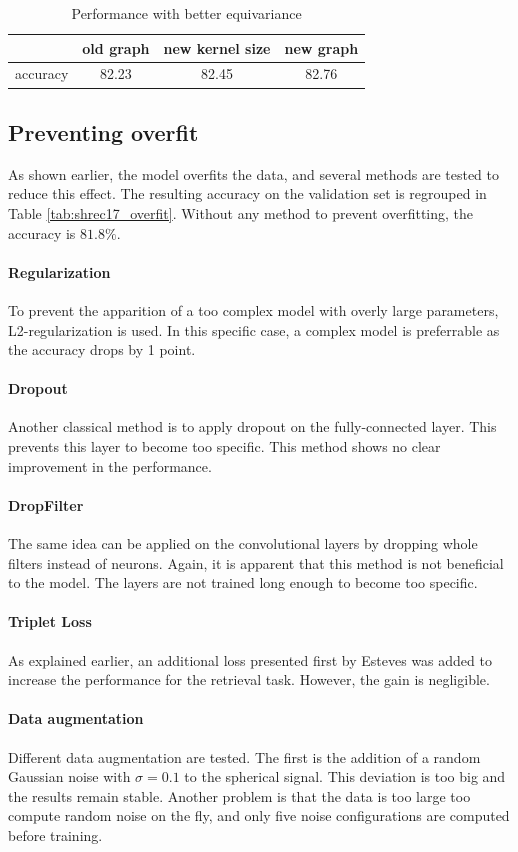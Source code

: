 \documentclass[11pt]{report}
\begin{document}
\begin{table}[]
    \centering
    \begin{tabular}{c|ccc}
          & old graph & new kernel size & new graph \\ \hline
accuracy  & 82.23 & 82.45 & 82.76
    \end{tabular}
    \caption{Performance with better equivariance}
    \label{tab:martino_shrec17}
\end{table}

\subsection{Preventing overfit}\label{sec:shrec17_overfit}
As shown earlier, the model overfits the data, and several methods are tested to reduce this effect. The resulting accuracy on the validation set is regrouped in Table \ref{tab:shrec17_overfit}. Without any method to prevent overfitting, the accuracy is $81.8\%$.
\paragraph*{Regularization}
To prevent the apparition of a too complex model with overly large parameters, L2-regularization is used. In this specific case, a complex model is preferrable as the accuracy drops by 1 point.
\paragraph*{Dropout}
Another classical method is to apply dropout on the fully-connected layer. This prevents this layer to become too specific. This method shows no clear improvement in the performance.
\paragraph*{DropFilter}
The same idea can be applied on the convolutional layers by dropping whole filters instead of neurons. Again, it is apparent that this method is not beneficial to the model. The layers are not trained long enough to become too specific.
\paragraph*{Triplet Loss}
As explained earlier, an additional loss presented first by Esteves was added to increase the performance for the retrieval task. However, the gain is negligible.
\paragraph*{Data augmentation}
Different data augmentation are tested. The first is the addition of a random Gaussian noise 
with $\sigma=0.1$ to the spherical signal. This deviation is too big and the results remain stable. Another problem is that the data is too large too compute random noise on the fly, and only five noise configurations are computed before training.
\end{document}
